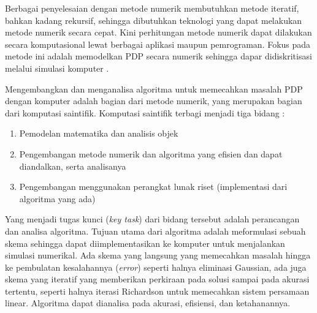Berbagai penyelesaian dengan metode numerik membutuhkan metode iteratif, bahkan kadang rekursif, sehingga dibutuhkan teknologi yang dapat melakukan metode numerik secara cepat. Kini perhitungan metode numerik dapat dilakukan secara komputasional lewat berbagai aplikasi maupun pemrograman. Fokus pada metode ini adalah memodelkan PDP secara numerik sehingga dapar didiskritisasi melalui simulasi komputer \citep{wick_2022_numerical}.

Mengembangkan dan menganalisa algoritma untuk memecahkan masalah PDP dengan komputer adalah bagian dari metode numerik, yang merupakan bagian dari komputasi saintifik. Komputasi saintifik terbagi menjadi tiga bidang \citep{wick_2022_numerical}:
\begin{enumerate}
    \item Pemodelan matematika dan analisis objek 
    \item Pengembangan metode numerik dan algoritma yang efisien dan dapat diandalkan, serta analisanya
    \item Pengembangan menggunakan perangkat lunak riset (implementasi dari algoritma yang ada)
\end{enumerate}
Yang menjadi tugas kunci (\emph{key task}) dari bidang tersebut adalah perancangan dan analisa algoritma. Tujuan utama dari algoritma adalah meformulasi sebuah skema sehingga dapat diimplementasikan ke komputer untuk menjalankan simulasi numerikal. Ada skema yang langsung yang memecahkan masalah hingga ke pembulatan kesalahannya (\emph{error}) seperti halnya eliminasi Gaussian, ada juga skema yang iteratif yang memberikan perkiraan pada solusi sampai pada akurasi tertentu, seperti halnya iterasi Richardson untuk memecahkan sistem persamaan linear. Algoritma dapat dianalisa pada akurasi, efisiensi, dan ketahanannya.

